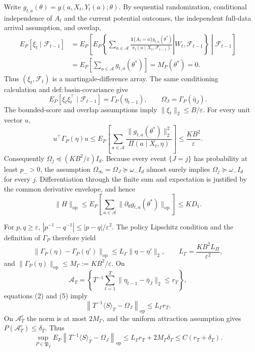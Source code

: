 Write \(g_{t,a}(\theta)=g(a,X_t,Y_t(a);\theta)\). By sequential randomization, conditional independence of \(A_t\) and the current potential outcomes, the independent full-data arrival assumption, and overlap,
\[
\begin{aligned}
 E_P[\xi_t\mid\mathcal F_{t-1}]
 &=E_P\!\left[E_P\!\left\{\left.\sum_{a\in\mathcal A}
 \frac{\mathbf1\{A_t=a\}g_{t,a}(\theta^*)}
 {\pi_t(a\mid X_t,\mathcal F_{t-1})}\right|W_t,\mathcal F_{t-1}\right\}\middle|\mathcal F_{t-1}\right]\\
 &=E_P\!\left[\sum_{a\in\mathcal A}g_{t,a}(\theta^*)\right]
 =M_P(\theta^*)=0.
\end{aligned}
\tag{1}
\]
Thus \((\xi_t,\mathcal F_t)\) is a martingale-difference array. The same conditioning calculation and \(\mathrm{def:basin\text{-}covariance}\) give
\[
 E_P[\xi_t\xi_t^\top\mid\mathcal F_{t-1}]=\Gamma_P(\eta_{t-1}),
 \qquad \Omega_J=\Gamma_P(\bar\eta_J).
\tag{2}
\]
The bounded-score and overlap assumptions imply \(\|\xi_t\|_2\le B/\varepsilon\). For every unit vector \(u\),
\[
 u^\top\Gamma_P(\eta)u
 \le E_P\!\left[\sum_{a\in\mathcal A}
 \frac{\|g_{t,a}(\theta^*)\|_2^2}{\Pi(a\mid X_t,\eta)}\right]
 \le\frac{KB^2}{\varepsilon}.
\tag{3}
\]
Consequently \(\Omega_j\preceq(KB^2/\varepsilon)I_d\). Because every event \(\{J=j\}\) has probability at least \(p_->0\), the assumption \(\Omega_\infty=\Omega_J\succeq\omega_-I_d\) almost surely implies \(\Omega_j\succeq\omega_-I_d\) for every \(j\). Differentiation through the finite sum and expectation is justified by the common derivative envelope, and hence
\[
 \|H\|_{\mathrm{op}}
 \le E_P\!\left[\sum_{a\in\mathcal A}
 \|\partial_\theta g_{t,a}(\theta^*)\|_{\mathrm{op}}\right]
 \le KD_1.
\tag{4}
\]

For \(p,q\ge\varepsilon\), \(|p^{-1}-q^{-1}|\le|p-q|/\varepsilon^2\). The policy Lipschitz condition and the definition of \(\Gamma_P\) therefore yield
\[
 \|\Gamma_P(\eta)-\Gamma_P(\eta')\|_{\mathrm{op}}
 \le L_\Gamma\|\eta-\eta'\|_2,
 \qquad L_\Gamma=\frac{KB^2L_\Pi}{\varepsilon^2},
\tag{5}
\]
and \(\|\Gamma_P(\eta)\|_{\mathrm{op}}\le M_\Gamma:=KB^2/\varepsilon\). On
\[
 \mathcal A_T=\left\{T^{-1}\sum_{t=1}^T
 \|\eta_{t-1}-\bar\eta_J\|_2\le r_T\right\},
\]
equations (2) and (5) imply
\[
 \left\|T^{-1}\langle S\rangle_T-\Omega_J\right\|_{\mathrm{op}}
 \le L_\Gamma r_T.
\tag{6}
\]
On \(\mathcal A_T^c\) the norm is at most \(2M_\Gamma\), and the uniform attraction assumption gives \(P(\mathcal A_T^c)\le\delta_T\). Thus
\[
 \sup_{P\in\mathfrak P_T}E_P\left\|T^{-1}\langle S\rangle_T-\Omega_J\right\|_{\mathrm{op}}
 \le L_\Gamma r_T+2M_\Gamma\delta_T
 \le C(r_T+\delta_T).
\tag{7}
\]

